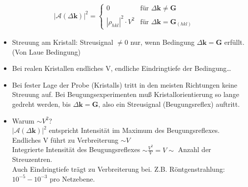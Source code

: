\begin{align*}
    \left| \mathcal{A} ( \Delta \textbf{k}) \right| ^2 = \begin{cases}
        0 & \text{für } \Delta \textbf{k} \neq \textbf{G}\\
        \left| \rho_ {hkl}\right|^2 \cdot V^2 &  \text{für } \Delta \textbf{k} = \textbf{G}_{(hkl)}
    \end{cases}
\end{align*}
\begin{itemize}
    \item Streuung am Kristall: Streusignal $\neq 0$ nur, wenn Bedingung $\Delta \textbf{k} = \textbf{G}$ erfüllt. (Von Laue Bedingung)
    \item Bei realen Kristallen endliches V, endliche Eindringtiefe der Bedingung\dots
    \item Bei fester Lage der Probe (Kristalls) tritt in den meisten Richtungen keine Streuung auf. Bei Beugungsexperimenten muß Kristallorientierung so lange gedreht werden, bis $\Delta \textbf{k} = \textbf{G}$, also ein Streusignal (Beugungsreflex) auftritt.
    \item Warum $\sim V^2$?\\
    $|\mathcal{A}(\Delta \textbf{k})|^2$ entspricht Intensität im Maximum des Beugungsreflexes. Endliches V führt zu Verbreiterung $\sim V$\\
    Integrierte Intensität des Beugungsreflexes $\sim \frac{V^2}{V} = V \sim$ Anzahl der Streuzentren.\\
    Auch Eindringtiefe trägt zu Verbreiterung bei. Z.B. Röntgenstrahlung: $10^{-5}-10^{-3}$ pro Netzebene.
\end{itemize}

